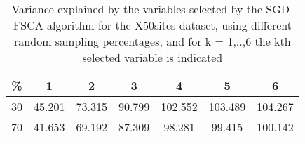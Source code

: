\begin{table}
	\begin{center}
		\begin{tabular}{c c c c c c c}
			\% & 1 & 2 & 3 & 4 & 5 & 6 \\
			\hline
			30 & 45.201 & 73.315 & 90.799 & 102.552 & 103.489 & 104.267 \\
			70 & 41.653 & 69.192 & 87.309 & 98.281 & 99.415 & 100.142 \\
		\end{tabular}
	\end{center}
	\caption{Variance explained by the variables selected by the SGD-FSCA algorithm for the X50sites dataset, using different random sampling percentages, and for k = 1,..,6 the kth selected variable is indicated}
\end{table}